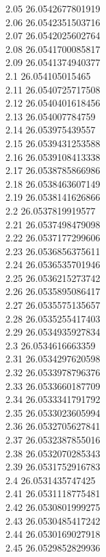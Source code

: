 {2.05	26.0542677801919\\
2.06	26.0542351503716\\
2.07	26.0542025602764\\
2.08	26.0541700085817\\
2.09	26.0541374940377\\
2.1	26.054105015465\\
2.11	26.0540725717508\\
2.12	26.0540401618456\\
2.13	26.054007784759\\
2.14	26.053975439557\\
2.15	26.0539431253588\\
2.16	26.0539108413338\\
2.17	26.0538785866986\\
2.18	26.0538463607149\\
2.19	26.0538141626866\\
2.2	26.0537819919577\\
2.21	26.0537498479098\\
2.22	26.0537177299606\\
2.23	26.0536856375611\\
2.24	26.0536535701946\\
2.25	26.0536215273742\\
2.26	26.0535895086417\\
2.27	26.0535575135657\\
2.28	26.0535255417403\\
2.29	26.0534935927834\\
2.3	26.0534616663359\\
2.31	26.0534297620598\\
2.32	26.0533978796376\\
2.33	26.0533660187709\\
2.34	26.0533341791792\\
2.35	26.0533023605994\\
2.36	26.0532705627841\\
2.37	26.0532387855016\\
2.38	26.0532070285343\\
2.39	26.0531752916783\\
2.4	26.0531435747425\\
2.41	26.0531118775481\\
2.42	26.0530801999275\\
2.43	26.0530485417242\\
2.44	26.0530169027918\\
2.45	26.0529852829936\\
}
